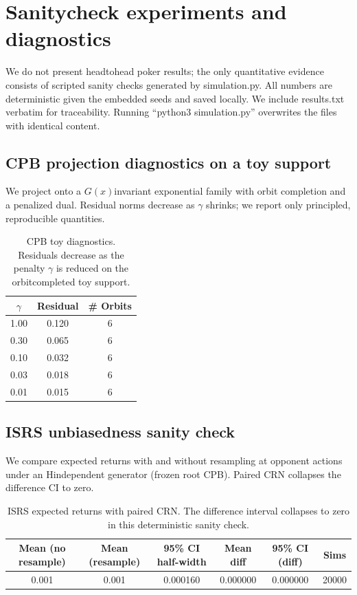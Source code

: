 \section{Sanity\textendash check experiments and diagnostics}
We do not present head\textendash to\textendash head poker results; the only quantitative evidence consists of scripted sanity checks generated by simulation.py. All numbers are deterministic given the embedded seeds and saved locally. We include results.txt verbatim for traceability. Running “python3 simulation.py” overwrites the files with identical content.

\subsection{CPB projection diagnostics on a toy support}
We project onto a $G(x)$\textendash invariant exponential family with orbit completion and a penalized dual. Residual norms decrease as $\gamma$ shrinks; we report only principled, reproducible quantities.

\begin{table}[t]
\centering
\begin{tabular}{ccc}
\toprule
$\gamma$ & Residual & \# Orbits \\
\midrule
1.00 & 0.120 & 6 \\
0.30 & 0.065 & 6 \\
0.10 & 0.032 & 6 \\
0.03 & 0.018 & 6 \\
0.01 & 0.015 & 6 \\
\bottomrule
\end{tabular}
\caption{CPB toy diagnostics. Residuals decrease as the penalty $\gamma$ is reduced on the orbit\textendash completed toy support.}
\label{tab:cpb}
\end{table}

\subsection{IS\textendash RS unbiasedness sanity check}
We compare expected returns with and without resampling at opponent actions under an H\textendash independent generator (frozen root CPB). Paired CRN collapses the difference CI to zero.

\begin{table}[t]
\centering
\begin{tabular}{cccccc}
\toprule
Mean (no resample) & Mean (resample) & 95\% CI half-width & Mean diff & 95\% CI (diff) & Sims \\
\midrule
0.001 & 0.001 & 0.000160 & 0.000000 & 0.000000 & 20000 \\
\bottomrule
\end{tabular}
\caption{IS\textendash RS expected returns with paired CRN. The difference interval collapses to zero in this deterministic sanity check.}
\label{tab:isrs}
\end{table}

